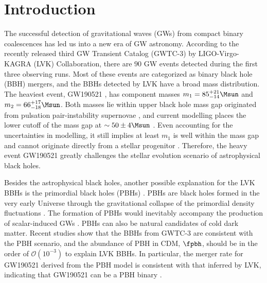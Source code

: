 \documentclass[
reprint,           %
superscriptaddress,%
amsmath,           %
amssymb,           %
aps,               %
prd,               %
notitlepage,       %
longbibliography,  %
floatfix,          %
nofootinbib,
]{revtex4-1}
\begin{document}
\maketitle

\section{Introduction}

The successful detection of gravitational waves (GWs) from compact binary coalescences \cite{LIGOScientific:2018mvr,LIGOScientific:2020ibl,LIGOScientific:2021djp} has led us into a new era of GW astronomy.
According to the recently released third GW Transient Catalog (GWTC-3) \cite{LIGOScientific:2021djp} by LIGO-Virgo-KAGRA (LVK) Collaboration, there are $90$ GW events detected during the first three observing runs. Most of these events are categorized as binary black hole (BBH) mergers, and the BBHs detected by LVK have a broad mass distribution. The heaviest event, GW190521 \cite{LIGOScientific:2020iuh}, has component masses $m_1 = 85^{+21}_{-14}\Msun$ and $m_2 = 66^{+17}_{-18}\Msun$. Both masses lie within upper black hole mass gap originated from pulsation pair-instability supernovae \cite{Marchant_2019}, and current modelling places the lower cutoff of the mass gap at $\sim 50\pm 4\Msun$ \cite{Belczynski:2016jno,Marchant_2019,Farmer_2019,Farmer:2020xne,Marchant:2020haw}.
Even accounting for the uncertainties in modelling, it still implies at least $m_1$ is well within the mass gap and cannot originate directly from a stellar progenitor \cite{Anagnostou:2020umw}.
Therefore, the heavy event GW190521 greatly challenges the stellar evolution scenario of astrophysical black holes.

Besides the astrophysical black holes, another possible explanation for the LVK BBHs is the primordial black holes (PBHs) \cite{Bird:2016dcv,Sasaki:2016jop,Chen:2018czv,Liu:2018ess,Chen:2021nxo}. 
PBHs are black holes formed in the very early Universe through the gravitational collapse of the primordial density fluctuations \cite{Hawking:1971ei,Carr:1974nx}. The formation of PBHs would inevitably accompany the production of scalar-induced GWs \cite{Saito:2008jc,Yuan:2019udt,Yuan:2019wwo,Yuan:2019fwv,Chen:2019xse,DeLuca:2019ufz,Bartolo:2018rku,Bartolo:2018evs}. PBHs can also be natural candidates of cold dark matter. Recent studies \cite{Chen:2021nxo,Chen:2022fda} show that the BBHs from GWTC-3 are consistent with the PBH scenario, and the abundance of PBH in CDM, $\fpbh$, should be in the order of $\mathcal{O}(10^{-3})$ to explain LVK BBHs. In particular, the merger rate for GW190521 derived from the PBH model is consistent with that inferred by LVK, indicating that GW190521 can be a PBH binary \cite{DeLuca:2020sae,Chen:2021nxo}.
\end{document}
